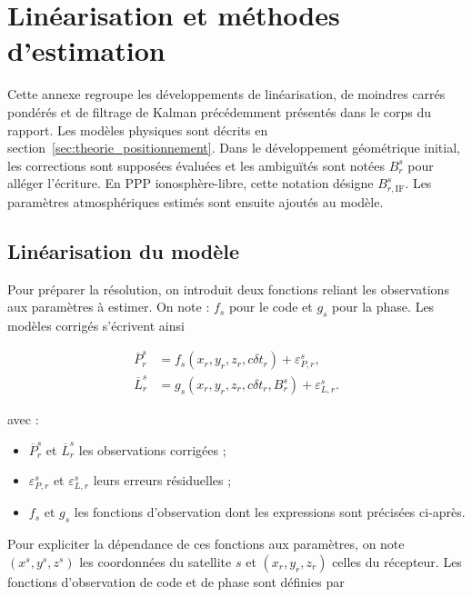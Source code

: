 \chapter{Linéarisation et méthodes d'estimation}
\label{ann:estimation}
\label{annexB}

Cette annexe regroupe les développements de linéarisation, de moindres carrés
pondérés et de filtrage de Kalman précédemment présentés dans le corps du
rapport. Les modèles physiques sont décrits en section~\ref{sec:theorie_positionnement}.
Dans le développement géométrique initial, les corrections sont supposées
évaluées et les ambiguïtés sont notées $B_r^s$ pour alléger l'écriture.
En PPP ionosphère-libre, cette notation désigne $B_{r,\mathrm{IF}}^s$.
Les paramètres atmosphériques estimés sont ensuite ajoutés au modèle.

\section{Linéarisation du modèle}
\label{ann:resolution}

Pour préparer la résolution, on introduit deux fonctions reliant les observations aux paramètres à estimer. On note :
$f_s$ pour le code et $g_s$ pour la phase. Les
modèles corrigés s'écrivent ainsi

\begin{align}
\overline P_r^s
&=f_s(x_r,y_r,z_r,c\delta t_r)+\varepsilon_{P,r}^s,
\\
\overline L_r^s
&=g_s(x_r,y_r,z_r,c\delta t_r,B_r^s)+\varepsilon_{L,r}^s.
\label{ann:eq:explicit_observation_functions}
\end{align}

avec :

\begin{itemize}
    \item $\overline P_r^s$ et $\overline L_r^s$ les observations corrigées ;
    \item $\varepsilon_{P,r}^s$ et $\varepsilon_{L,r}^s$ leurs erreurs
    résiduelles ;
    \item $f_s$ et $g_s$ les fonctions d'observation dont les expressions
    sont précisées ci-après.
\end{itemize}


Pour expliciter la dépendance de ces fonctions aux paramètres, on note
$(x^s,y^s,z^s)$ les coordonnées du satellite $s$ et
$(x_r,y_r,z_r)$ celles du récepteur. Les fonctions d'observation de code et de
phase sont définies par

